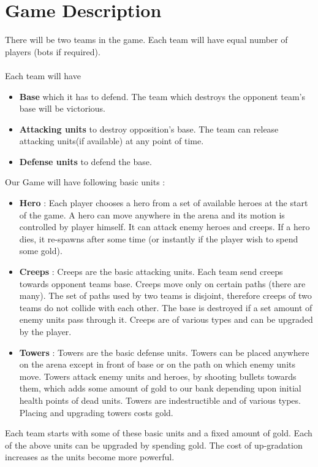 \documentclass{article}
\begin{document}
\section{Game Description}
There will be two teams in the game. Each team will have equal number of players (bots if required).\\\\
Each team will have
\begin{itemize}
\item \textbf{Base} which it has to defend. The team which destroys the opponent team's base will be victorious.
\item \textbf{Attacking units} to destroy opposition's base. The team can release attacking units(if available) at any point of time.
\item \textbf{Defense units} to defend the base.
\end{itemize}
Our Game will have following basic units : 
\begin{itemize}
\item \textbf{Hero} :
Each player chooses a hero from a set of available heroes at the start of the game. A hero can move anywhere in the arena and its motion is controlled by player himself. It can attack enemy heroes and creeps. If a hero dies, it re-spawns after some time (or instantly if the player wish to spend some gold).

\item \textbf{Creeps} :
Creeps are the basic attacking units. Each team send creeps towards opponent teams base. Creeps move only on certain paths (there are many). The set of paths used by two teams is disjoint, therefore creeps of two teams do not collide with each other. The base is destroyed if a set amount of enemy units pass through it. Creeps are of various types and can be upgraded by the player.

\item \textbf{Towers} :
Towers are the basic defense units. Towers can be placed anywhere on the arena except in front of base or on the path on which enemy units move. Towers attack enemy units and heroes, by shooting bullets towards them, which adds some amount of gold to our bank depending upon initial health points of dead units. Towers are indestructible and of various types. Placing and upgrading towers costs gold.
\end{itemize}
Each team starts with some of these basic units and a fixed amount of gold. Each of the above units can be upgraded by spending gold. The cost of up-gradation increases as the units become more powerful.
\end{document}
